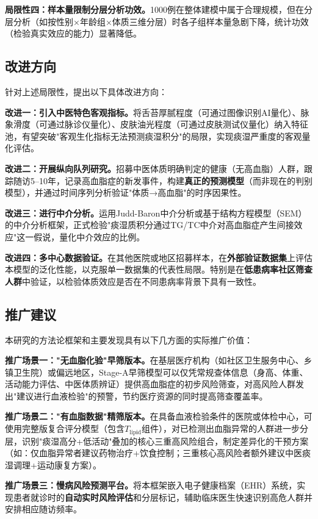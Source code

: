 \documentclass[12pt,a4paper]{ctexart}
\begin{document}
\textbf{局限性四：样本量限制分层分析功效。}1000例在整体建模中属于合理规模，但在分层分析（如按性别×年龄组×体质三维分层）时各子组样本量急剧下降，统计功效（检验真实效应的能力）显著降低。

\subsection{改进方向}

针对上述局限性，提出以下具体改进方向：

\textbf{改进一：引入中医特色客观指标。}将舌苔厚腻程度（可通过图像识别AI量化）、脉象滑度（可通过脉诊仪量化）、皮肤油光程度（可通过皮肤测试仪量化）纳入特征池，有望突破"客观生化指标无法预测痰湿积分"的局限，实现痰湿严重度的客观量化评估。

\textbf{改进二：开展纵向队列研究。}招募中医体质明确判定的健康（无高血脂）人群，跟踪随访5--10年，记录高血脂症的新发事件，构建\textbf{真正的预测模型}（而非现在的判别模型），并通过时间序列分析验证"体质→高血脂"的时序因果性。

\textbf{改进三：进行中介分析。}运用Judd-Baron中介分析或基于结构方程模型（SEM）的中介分析框架，正式检验"痰湿质积分通过TG/TC中介对高血脂症产生间接效应"这一假说，量化中介效应的比例。

\textbf{改进四：多中心数据验证。}在其他医院或地区招募样本，在\textbf{外部验证数据集}上评估本模型的泛化性能，以克服单一数据集的代表性局限。特别是在\textbf{低患病率社区筛查人群}中验证，以检验体质效应是否在不同患病率背景下具有一致性。

\subsection{推广建议}

本研究的方法论框架和主要发现具有以下几方面的实际推广价值：

\textbf{推广场景一："无血脂化验"早筛版本。}在基层医疗机构（如社区卫生服务中心、乡镇卫生院）或偏远地区，Stage-A早筛模型可以仅凭常规查体信息（身高、体重、活动能力评估、中医体质辨证）提供高血脂症的初步风险筛查，对高风险人群发出"建议进行血液检验"的预警，节约医疗资源的同时提高筛查覆盖率。

\textbf{推广场景二："有血脂数据"精筛版本。}在具备血液检验条件的医院或体检中心，可使用完整版复合评分模型（包含$T_{\text{lipid}}$组件），对已检测出血脂异常的人群进一步分层，识别"痰湿高分+低活动"叠加的核心三重高风险组合，制定差异化的干预方案（如：仅血脂异常者建议药物治疗+饮食控制；三重核心高风险者额外建议中医痰湿调理+运动康复方案）。

\textbf{推广场景三：慢病风险预测平台。}将本框架嵌入电子健康档案（EHR）系统，实现患者就诊时的\textbf{自动实时风险评估}和分层标记，辅助临床医生快速识别高危人群并安排相应随访频率。
\end{document}
